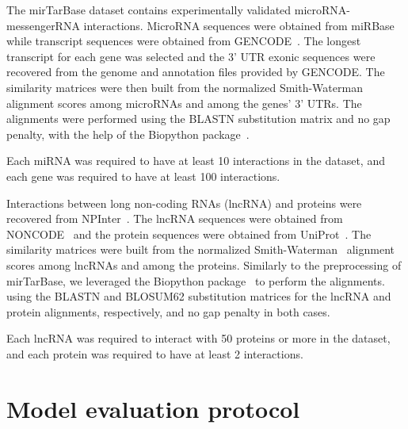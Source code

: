 The mirTarBase dataset contains experimentally validated microRNA-messengerRNA interactions. MicroRNA sequences were obtained from miRBase~\cite{griffiths2006mirbase} while transcript sequences were obtained from GENCODE~\cite{frankish2021gencode}. The longest transcript for each gene was selected and the 3' UTR exonic sequences were recovered from the genome and annotation files provided by GENCODE. The similarity matrices were then built from the normalized Smith-Waterman~\cite{yamanishi2008} alignment scores among microRNAs and among the genes' 3' UTRs. The alignments were performed using the BLASTN substitution matrix and no gap penalty, with the help of the Biopython package~\cite{cock2009biopython}.

Each miRNA was required to have at least 10 interactions in the dataset, and each gene was required to have at least 100 interactions.

Interactions between long non-coding RNAs (lncRNA) and proteins were recovered from NPInter~\cite{wu2006npinter, teng2020npinter}. The lncRNA sequences were obtained from NONCODE~\cite{zhao2016noncode} and the protein sequences were obtained from UniProt~\cite{uniprot2019}. The similarity matrices were built from the normalized Smith-Waterman~\cite{yamanishi2008} alignment scores among lncRNAs and among the proteins. Similarly to the preprocessing of mirTarBase, we leveraged the Biopython package~\cite{cock2009biopython} to perform the alignments. using the BLASTN and BLOSUM62 substitution matrices for the lncRNA and protein alignments, respectively, and no gap penalty in both cases.

Each lncRNA was required to interact with 50 proteins or more in the dataset, and each protein was required to have at least 2 interactions.


\section{Model evaluation protocol}
\label{sec:evaluation_protocol}


